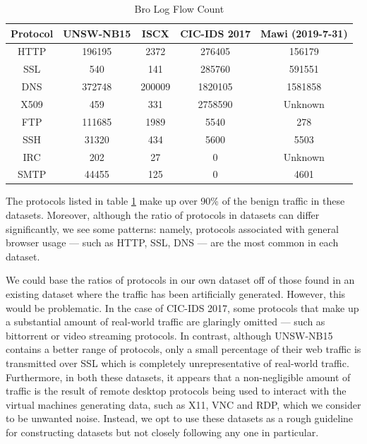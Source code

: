 \documentclass[msc,deptreport, cs]{infthesis} %
\begin{document}
\begin{table}[ht!]
\begin{center}
\begin{small}
\begin{sc}
\begin{tabular}{ccccc}
\hline
\abovespace\belowspace
Protocol & UNSW-NB15 & ISCX & CIC-IDS 2017 & Mawi (2019-7-31)\\
\hline
\abovespace
HTTP         & 196195          & 2372        & 276405   &           156179   \\
SSL          & 540          & 141         & 285760     &      591551      \\
DNS          & 372748          & 200009          & 1820105      &    1581858      \\
X509          & 459          & 331          & 2758590      &     Unknown     \\
FTP          & 111685         &  1989         & 5540        &   278    \\
SSH          & 31320          & 434       & 5600         &   5503    \\
IRC          & 202          &  27       & 0          &    Unknown  \\
\belowspace
SMTP          & 44455         & 125         & 0      &      4601   \\
\hline
\end{tabular}
\end{sc}
\end{small}
\vskip -2mm
\caption{Bro Log Flow Count}
\label{tab:results-bro}
\end{center}
\vskip -4mm
\end{table}

The protocols listed in table \ref{tab:results-bro} make up over 90\% of the benign traffic in these datasets. Moreover, although the ratio of protocols in datasets can differ significantly, we see some patterns: namely, protocols associated with general browser usage --- such as HTTP, SSL, DNS --- are the most common in each dataset. 

We could base the ratios of protocols in our own dataset off of those found in an existing dataset where the traffic has been artificially generated. However, this would be problematic. In the case of CIC-IDS 2017, some protocols that make up a substantial amount of real-world traffic are glaringly omitted --- such as bittorrent or video streaming protocols. In contrast, although UNSW-NB15 contains a better range of protocols, only a small percentage of their web traffic is transmitted over SSL which is completely unrepresentative of real-world traffic. Furthermore, in both these datasets, it appears that a non-negligible amount of traffic is the result of remote desktop protocols being used to interact with the virtual machines generating data, such as X11, VNC and RDP, which we consider to be unwanted noise. Instead, we opt to use these datasets as a rough guideline for constructing datasets but not closely following any one in particular.
\end{document}
